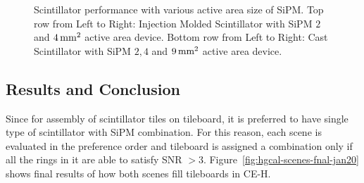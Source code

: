 \begin{figure}
  \caption[Scintillator performance with various active area size
    of \gls{SiPM}]{Scintillator performance with various active area size
    of \gls{SiPM}. Top row from Left to Right: Injection Molded
    Scintillator with \gls{SiPM} \( 2 \) and \( 4\,\text{mm}{}^2 \) active area device.
    Bottom row from Left to Right: Cast Scintillator with
    \gls{SiPM} \( 2,4 \) and \( 9\,\text{mm}{}^2 \) active area device.}%
  \label{fig:hgcal-scint-everywhere}
\end{figure}

\subsection{
  Results and Conclusion
}

Since for assembly of scintillator tiles on tileboard, it is preferred
to have single type of scintillator with \gls{SiPM} combination.
For this reason, each scene is evaluated in the preference order
and tileboard is assigned a combination only
if all the rings in it are able to satisfy \gls{SNR} \( > 3\).
Figure~\ref{fig:hgcal-scenes-fnal-jan20} shows final
results of how both scenes fill tileboards in \gls{CE-H}.

